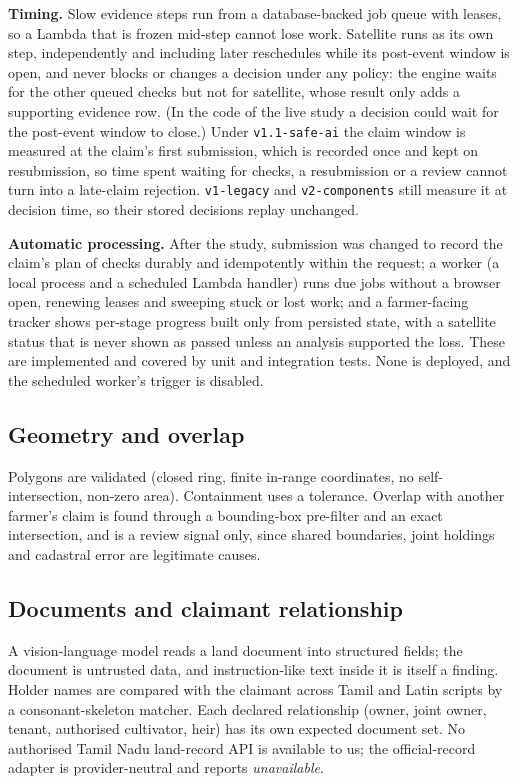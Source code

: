 \documentclass[journal]{IEEEtran}
\begin{document}
\textbf{Timing.} Slow evidence steps run from a database-backed job queue with leases, so a Lambda that is frozen mid-step cannot lose work. Satellite runs as its own step, independently and including later reschedules while its post-event window is open, and never blocks or changes a decision under any policy: the engine waits for the other queued checks but not for satellite, whose result only adds a supporting evidence row. (In the code of the live study a decision could wait for the post-event window to close.) Under \texttt{v1.1-safe-ai} the claim window is measured at the claim's first submission, which is recorded once and kept on resubmission, so time spent waiting for checks, a resubmission or a review cannot turn into a late-claim rejection. \texttt{v1-legacy} and \texttt{v2-components} still measure it at decision time, so their stored decisions replay unchanged.

\textbf{Automatic processing.} After the study, submission was changed to record the claim's plan of checks durably and idempotently within the request; a worker (a local process and a scheduled Lambda handler) runs due jobs without a browser open, renewing leases and sweeping stuck or lost work; and a farmer-facing tracker shows per-stage progress built only from persisted state, with a satellite status that is never shown as passed unless an analysis supported the loss. These are implemented and covered by unit and integration tests. None is deployed, and the scheduled worker's trigger is disabled.

\subsection{Geometry and overlap}
Polygons are validated (closed ring, finite in-range coordinates, no self-intersection, non-zero area). Containment uses a tolerance. Overlap with another farmer's claim is found through a bounding-box pre-filter and an exact intersection, and is a review signal only, since shared boundaries, joint holdings and cadastral error are legitimate causes.

\subsection{Documents and claimant relationship}
A vision-language model reads a land document into structured fields; the document is untrusted data, and instruction-like text inside it is itself a finding. Holder names are compared with the claimant across Tamil and Latin scripts by a consonant-skeleton matcher. Each declared relationship (owner, joint owner, tenant, authorised cultivator, heir) has its own expected document set. No authorised Tamil Nadu land-record API is available to us; the official-record adapter is provider-neutral and reports \emph{unavailable}.
\end{document}
